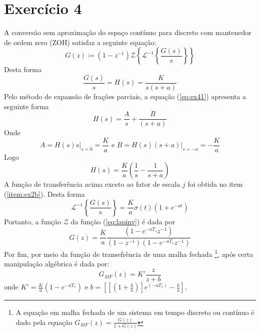 \documentclass{article}
\begin{document}
\section*{Exercício 4}
A conversão sem aproximação do espaço contínuo para discreto com mantenedor de ordem zero (ZOH) satisfaz a seguinte equação:
\begin{equation}
G(z) \coloneqq (1-z^{-1}) \mathcal{Z}\left\{\mathcal{L}^{-1}\left\{\frac{G(s)}{s}\right\}\right\}
\end{equation}
Desta forma
\begin{equation}
\label{eq:ex41}
\frac{G(s)}{s} = H(s) = \frac{K}{s(s+a)}
\end{equation}
Pelo método de expansão de frações parciais, a equação (\ref{eq:ex41}) apresenta a seguinte forma
\begin{equation}
H(s) = \frac{A}{s} + \frac{B}{(s+a)} 
\end{equation}
Onde 
\begin{equation}
A = H(s) s \bigg\rvert_{s=0} = \frac{K}{a} \mbox{ e } B = H(s) (s+a)\bigg\rvert_{s=-a} = -\frac{K}{a}
\end{equation}
Logo
\begin{equation}
H(s) = \frac{K}{a} \left( \frac{1}{s} - \frac{1}{s+a} \right)
\end{equation}
A função de transferência acima exceto ao fator de escala $j$ foi obtida no item (\ref{item:ex2b}). Desta forma
\begin{equation}
\label{eq:lapinv}
\mathcal{L}^{-1}\left\{\frac{G(s)}{s}\right\} = \frac{K}{a}\sigma(t)\left(1+e^{-at}\right)
\end{equation}
Portanto, a função $\mathcal{Z}$ da função (\ref{eq:lapinv}) é dada por
\begin{equation}
G(z) = \frac{K}{a} \frac{(1 - e^{-aT_s}z^{-1})}{(1-z^{-1})(1 - e^{-aT_s}z^{-1})}
\end{equation}
Por fim, por meio da função de transefrência de uma malha fechada \footnote{A equação em malha fechada de um sistema em tempo discreto ou contínuo é dado pela equação $G_{MF}(z) = \frac{G(z)}{1+G(z)}$}, após certa manipulação algébrica é dada por:
\begin{equation}
G_{MF}(z) = K' \frac{z}{z+b}
\end{equation}
onde $K' = \frac{K}{a} (1-e^{-aT_s}) \mbox{ e } b = \left[\left[(1 + \frac{k}{a})\right]e^(-aT_s) - \frac{k}{a} \right] $.
\end{document}
